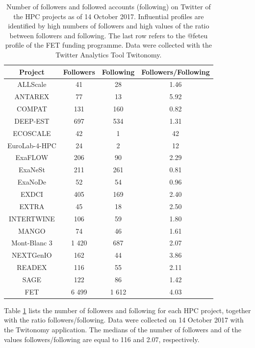 \begin{table}[t]
 \begin{center}
 {\footnotesize
  \begin{tabular}{cccc}
   \hline 
   \hline
   Project & Followers & Following & Followers/Following \\ 
   \hline
   \hline
   ALLScale & 41 & 28 & 1.46 \\
   ANTAREX & 77 & 13 & 5.92 \\
   COMPAT & 131 & 160 & 0.82 \\
   DEEP-EST & 697 & 534 & 1.31 \\
   ECOSCALE & 42 & 1 & 42 \\
   EuroLab-4-HPC & 24 & 2 & 12 \\
   ExaFLOW & 206 & 90 & 2.29 \\
   ExaNeSt & 211 & 261 & 0.81  \\
   ExaNoDe & 52 & 54 & 0.96 \\
   EXDCI & 405 & 169 & 2.40 \\
   EXTRA & 45 & 18 & 2.50\\
   INTERTWINE & 106 & 59 & 1.80 \\
   MANGO & 74 & 46 & 1.61 \\
   Mont-Blanc 3 & 1 420 & 687 & 2.07 \\
   NEXTGenIO & 162 & 44 & 3.86 \\
   READEX & 116 & 55 & 2.11 \\
   SAGE & 122 & 86 & 1.42 \\ 
   FET & 6 499 & 1 612 & 4.03 \\
   \hline
   \hline
  \end{tabular}
 } 
 \end{center} 
 \caption{Number of followers and followed accounts (following) on Twitter of the HPC projects as of 14 October 2017. Influential profiles are identified by high numbers of followers and high values of the ratio between followers and following. The last row refers to the @fet\textunderscore eu profile of the FET funding programme. Data were collected with the Twitter Analytics Tool Twitonomy.}
\label{HPC_influence_table} 
\end{table}

Table \ref{HPC_influence_table} lists the number of followers and following for each HPC project, together with the ratio followers/following. Data were collected on 14 October 2017 with the Twitonomy application. The medians of the number of followers and of the values followers/following are equal to 116 and 2.07, respectively. 

